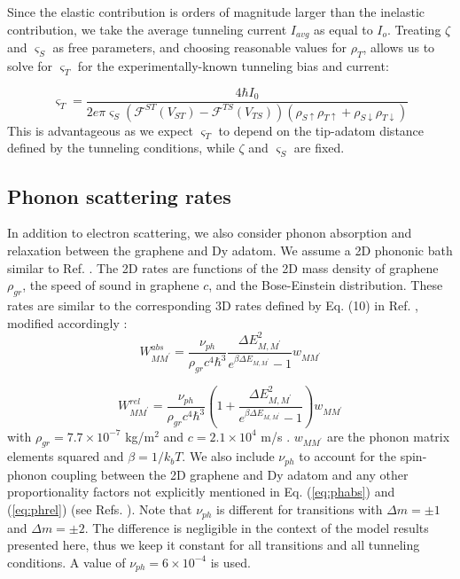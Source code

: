 \documentclass[reprint,amsmath,amssymb,aps,nofootinbib,onecolumn]{revtex4-2}
\begin{document}
Since the elastic contribution is orders of magnitude larger than the inelastic contribution, we take the average tunneling current $I_{avg}$ as equal to $I_{o}$. Treating $\zeta$ and $\varsigma_{S}$ as free parameters, and choosing reasonable values for $\rho_T$, allows us to solve for $\varsigma_{T}$ for the experimentally-known tunneling bias and current:

\begin{equation}
\varsigma_{T} =  \dfrac{4 \hbar I_0}{2 e \pi \varsigma_{S} \left( \mathcal{F}^{ST}(V_{ST})-\mathcal{F}^{TS}(V_{TS}) \right)\left( \rho_{S \uparrow} \rho_{T\uparrow} + \rho_{S \downarrow} \rho_{T\downarrow} \right)}
\label{eq:el_rate}
\end{equation} 
This is advantageous as we expect $\varsigma_{T}$ to depend on the tip-adatom distance defined by the tunneling conditions, while $\zeta$ and $\varsigma_{S}$ are fixed.  

\subsection{Phonon scattering rates}
\label{phonon}
In addition to electron scattering, we also consider phonon absorption and relaxation between the graphene and Dy adatom. We assume a 2D phononic bath similar to Ref. \cite{cervetti2016}. The 2D rates are functions of the 2D mass density of graphene $\rho_{gr}$, the speed of sound in graphene $c$, and the Bose-Einstein distribution. These rates are similar to the corresponding 3D rates defined by Eq. (10) in Ref. \cite{politi_tunneling_1995}, modified accordingly \cite{cervetti2016}: 
\begin{equation}
 W_{MM^{\prime}}^{abs} =  \frac{ \nu_{ph}}{\rho_{gr} c^4 \hbar^3} \frac{\Delta E_{M,M^{\prime}}^2}{e^{\beta \Delta E_{M,M^{\prime}}} - 1} w_{MM^{\prime}}
 \label{eq:phabs}
\end{equation}

\begin{equation}
 W_{MM^{\prime}}^{rel} =  \frac{ \nu_{ph}}{\rho_{gr} c^4 \hbar^3} \left( 1 + \frac{\Delta E_{M,M^{\prime}}^2}{e^{\beta \Delta E_{M,M^{\prime}}} - 1}\right) w_{MM^{\prime}}
 \label{eq:phrel}
\end{equation}
\noindent
with $\rho_{gr} = 7.7 \times 10^{-7}$ kg/m$^2$ and $c = 2.1 \times 10^4$ m/s \cite{Falkovsky2007}. $w_{MM^{\prime}}$ are the phonon matrix elements squared and $\beta = 1/ k_{b} T$. We also include $\nu_{ph}$ to account for the spin-phonon coupling between the 2D graphene and Dy adatom and any other proportionality factors not explicitly mentioned in Eq. (\ref{eq:phabs}) and (\ref{eq:phrel}) (see Refs. \cite{Leuenberger2000,cervetti2016}). Note that $\nu_{ph}$ is different for transitions with $\Delta m = \pm 1$ and $\Delta m = \pm 2$. The difference is negligible in the context of the model results presented here, thus we keep it constant for all transitions and all tunneling conditions. A value of $\nu_{ph} = 6 \times 10^{-4}$ is used. \par
\end{document}
